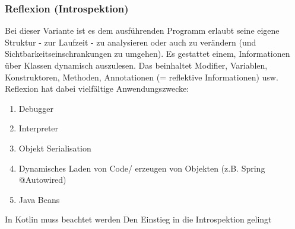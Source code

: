 \subsubsection{Reflexion (Introspektion)}
Bei dieser Variante ist es dem ausführenden Programm erlaubt seine eigene Struktur - zur Laufzeit - zu analysieren oder auch zu verändern (und Sichtbarkeitseinschrankungen zu umgehen). Es gestattet einem, Informationen über Klassen dynamisch auszulesen. Das beinhaltet Modifier, Variablen, Konstruktoren, Methoden, Annotationen (= reflektive Informationen) usw. Reflexion hat dabei vielfältige Anwendungszwecke:
\begin{enumerate}
	\item Debugger
	\item Interpreter
	\item Objekt Serialisation
	\item Dynamisches Laden von Code/ erzeugen von Objekten (z.B. Spring @Autowired)
	\item Java Beans
\end{enumerate}
\bigskip
In Kotlin muss beachtet werden
Den Einstieg in die Introspektion gelingt 

